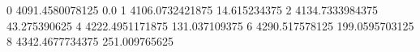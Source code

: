 0 4091.4580078125 0.0
1 4106.0732421875 14.615234375
2 4134.7333984375 43.275390625
4 4222.4951171875 131.037109375
6 4290.517578125 199.0595703125
8 4342.4677734375 251.009765625
